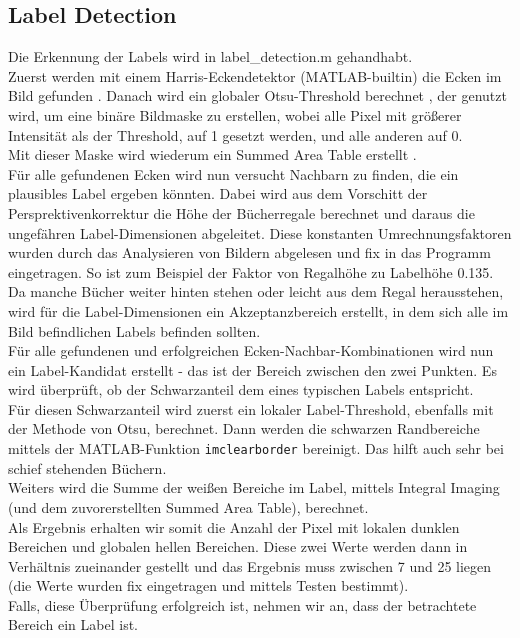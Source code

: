 \documentclass[paper=A4, deutsch]{scrartcl}
\begin{document}
\subsection{Label Detection}
Die Erkennung der Labels wird in label\_detection.m gehandhabt.\\
Zuerst werden mit einem Harris-Eckendetektor (MATLAB-builtin) die Ecken im Bild gefunden \cite{harris}. Danach wird ein globaler Otsu-Threshold berechnet \cite{otsu}, der genutzt wird, um eine binäre Bildmaske zu erstellen, wobei alle Pixel mit größerer Intensität als der Threshold, auf 1 gesetzt werden, und alle anderen auf 0.\\
Mit dieser Maske wird wiederum ein Summed Area Table erstellt \cite{integralimg}.\\
Für alle gefundenen Ecken wird nun versucht Nachbarn zu finden, die ein plausibles Label ergeben könnten. Dabei wird aus dem Vorschitt der Persprektivenkorrektur die Höhe der Bücherregale berechnet und daraus die ungefähren Label-Dimensionen abgeleitet. Diese konstanten Umrechnungsfaktoren wurden durch das Analysieren von Bildern abgelesen und fix in das Programm eingetragen. So ist zum Beispiel der Faktor von Regalhöhe zu Labelhöhe 0.135. Da manche Bücher weiter hinten stehen oder leicht aus dem Regal herausstehen, wird für die Label-Dimensionen ein Akzeptanzbereich erstellt, in dem sich alle im Bild befindlichen Labels befinden sollten.\\
Für alle gefundenen und erfolgreichen Ecken-Nachbar-Kombinationen wird nun ein Label-Kandidat erstellt - das ist der Bereich zwischen den zwei Punkten. Es wird überprüft, ob der Schwarzanteil dem eines typischen Labels entspricht.\\
Für diesen Schwarzanteil wird zuerst ein lokaler Label-Threshold, ebenfalls mit der Methode von Otsu, berechnet. Dann werden die schwarzen Randbereiche mittels der MATLAB-Funktion \texttt{imclearborder} bereinigt. Das hilft auch sehr bei schief stehenden Büchern.\\
Weiters wird die Summe der weißen Bereiche im Label, mittels Integral Imaging (und dem zuvorerstellten Summed Area Table), berechnet.\\
Als Ergebnis erhalten wir somit die Anzahl der Pixel mit lokalen dunklen Bereichen und globalen hellen Bereichen. Diese zwei Werte werden dann in Verhältnis zueinander gestellt und das Ergebnis muss zwischen 7 und 25 liegen (die Werte wurden fix eingetragen und mittels Testen bestimmt).\\
Falls, diese Überprüfung erfolgreich ist, nehmen wir an, dass der betrachtete Bereich ein Label ist.\\
\end{document}
